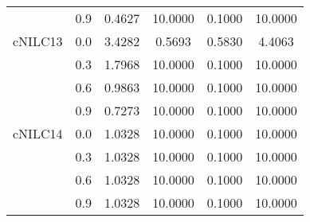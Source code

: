 \begin{longtable}{cccccc}
        & 0.9 & 0.4627 & 10.0000 & 0.1000 & 10.0000 \\
cNILC13 & 0.0 & 3.4282 & 0.5693 & 0.5830 & 4.4063 \\
        & 0.3 & 1.7968 & 10.0000 & 0.1000 & 10.0000 \\
        & 0.6 & 0.9863 & 10.0000 & 0.1000 & 10.0000 \\
        & 0.9 & 0.7273 & 10.0000 & 0.1000 & 10.0000 \\
cNILC14 & 0.0 & 1.0328 & 10.0000 & 0.1000 & 10.0000 \\
        & 0.3 & 1.0328 & 10.0000 & 0.1000 & 10.0000 \\
        & 0.6 & 1.0328 & 10.0000 & 0.1000 & 10.0000 \\
        & 0.9 & 1.0328 & 10.0000 & 0.1000 & 10.0000 \\
\end{longtable}
